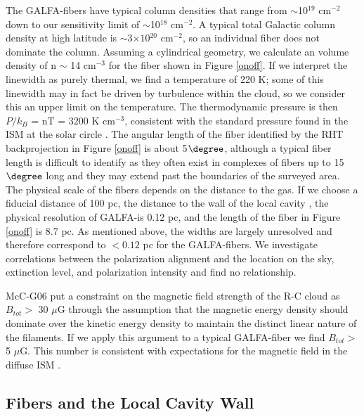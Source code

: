 The GALFA-\hi fibers have typical column densities that range from $\sim$10${^{19}}$ cm${^{-2}}$ down to our sensitivity limit of $\sim$10${^{18}}$ cm${^{-2}}$. A typical total Galactic \hi column density at high latitude is $\sim$3$\times 10{^{20}}$ cm${^{-2}}$, so an individual fiber does not dominate the column. Assuming a cylindrical geometry, we calculate an \hi volume density of n $\sim$ 14 cm$^{-3}$ for the fiber shown in Figure \ref{onoff}. 
If we interpret the linewidth as purely thermal, we find a temperature of 220 K; some of this linewidth may in fact be driven by turbulence within the cloud, so we consider this an upper limit on the temperature. The thermodynamic pressure is then $P/k_B$ = nT = $3200$ K cm$^{-3}$, consistent with the standard pressure found in the ISM at the solar circle \citep{Wolfire2003}. The angular length of the fiber identified by the RHT backprojection in Figure \ref{onoff} is about 5${\degree}$, although a typical fiber length is difficult to identify as they often exist in complexes of fibers up to 15${\degree}$ long and they may extend past the boundaries of the surveyed area. The physical scale of the fibers depends on the distance to the gas. If we choose a fiducial distance of 100 pc, the distance to the wall of the local cavity \citep{Sfeir:1999tz}, the physical resolution of GALFA-\hi is 0.12 pc, and the length of the fiber in Figure \ref{onoff} is 8.7 pc.  As mentioned above, the widths are largely unresolved and therefore correspond to $<0.12$ pc for the GALFA-\hi fibers.  We investigate correlations between the polarization alignment and the location on the sky, extinction level, and polarization intensity and find no relationship. 

McC-G06 put a constraint on the magnetic field strength of the R-C cloud as $B_{tot} >$ 30 $\mu$G through the assumption that the magnetic energy density should dominate over the kinetic energy density to maintain the distinct linear nature of the filaments. If we apply this argument to a typical GALFA-\hi fiber we find ${B_{tot}} >$ 5 ${\mu}$G. This number is consistent with expectations for the magnetic field in the diffuse ISM \citep{Heiles:2005tb}. 

\subsection{Fibers and the Local Cavity Wall}\label{lcwall}


